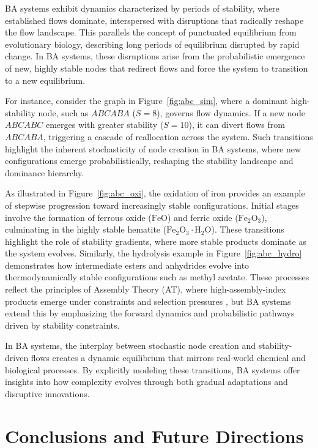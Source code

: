 \documentclass[entropy,article,submit,pdftex,oneauthor]{Definitions/mdpi}
\begin{document}
BA systems exhibit dynamics characterized by periods of stability, where established flows dominate, interspersed with disruptions that radically reshape the flow landscape. This parallels the concept of punctuated equilibrium from evolutionary biology, describing long periods of equilibrium disrupted by rapid change. In BA systems, these disruptions arise from the probabilistic emergence of new, highly stable nodes that redirect flows and force the system to transition to a new equilibrium.

For instance, consider the graph in Figure~\ref{fig:abc_sim}, where a dominant high-stability node, such as \( ABCABA \) (\( S = 8 \)), governs flow dynamics. If a new node \( ABCABC \) emerges with greater stability (\( S = 10 \)), it can divert flows from \( ABCABA \), triggering a cascade of reallocation across the system. Such transitions highlight the inherent stochasticity of node creation in BA systems, where new configurations emerge probabilistically, reshaping the stability landscape and dominance hierarchy.

As illustrated in Figure~\ref{fig:abc_oxi}, the oxidation of iron provides an example of stepwise progression toward increasingly stable configurations. Initial stages involve the formation of ferrous oxide (\( \text{FeO} \)) and ferric oxide (\( \text{Fe}_2\text{O}_3 \)), culminating in the highly stable hematite (\( \text{Fe}_2\text{O}_3 \cdot \text{H}_2\text{O} \)). These transitions highlight the role of stability gradients, where more stable products dominate as the system evolves. Similarly, the hydrolysis example in Figure~\ref{fig:abc_hydro} demonstrates how intermediate esters and anhydrides evolve into thermodynamically stable configurations such as methyl acetate. These processes reflect the principles of Assembly Theory (AT), where high-assembly-index products emerge under constraints and selection pressures \cite{walker2023nature}, but BA systems extend this by emphasizing the forward dynamics and probabilistic pathways driven by stability constraints.

In BA systems, the interplay between stochastic node creation and stability-driven flows creates a dynamic equilibrium that mirrors real-world chemical and biological processes. By explicitly modeling these transitions, BA systems offer insights into how complexity evolves through both gradual adaptations and disruptive innovations.


\section{Conclusions and Future Directions}
\end{document}
